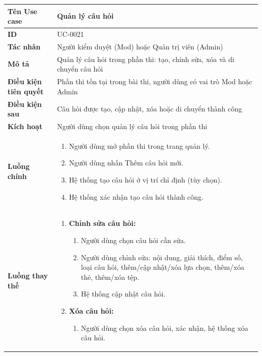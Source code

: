 {
\renewcommand{\arraystretch}{1.5}

\begin{tabularx}{\textwidth}{|>{\raggedright\arraybackslash}X|>{\raggedright\arraybackslash}X|}
\hline
\textbf{Tên Use case} & Quản lý câu hỏi \\
\hline
\textbf{ID} & UC-0021 \\
\hline
\textbf{Tác nhân} & Người kiểm duyệt (Mod) hoặc Quản trị viên (Admin) \\
\hline
\textbf{Mô tả} & Quản lý câu hỏi trong phần thi: tạo, chỉnh sửa, xóa và di chuyển câu hỏi \\
\hline
\textbf{Điều kiện tiên quyết} & Phần thi tồn tại trong bài thi, người dùng có vai trò Mod hoặc Admin \\
\hline
\textbf{Điều kiện sau} & Câu hỏi được tạo, cập nhật, xóa hoặc di chuyển thành công \\
\hline
\textbf{Kích hoạt} & Người dùng chọn quản lý câu hỏi trong phần thi \\
\hline
\textbf{Luồng chính} &
\begin{enumerate}
    \item Người dùng mở phần thi trong trang quản lý.
    \item Người dùng nhấn Thêm câu hỏi mới.
    \item Hệ thống tạo câu hỏi ở vị trí chỉ định (tùy chọn).
    \item Hệ thống xác nhận tạo câu hỏi thành công.
\end{enumerate} \\
\hline
\textbf{Luồng thay thế} &
\begin{enumerate}
    \item \textbf{Chỉnh sửa câu hỏi:}
    \begin{enumerate}
        \item[2A.] Người dùng chọn câu hỏi cần sửa.
        \item[3A.] Người dùng chỉnh sửa: nội dung, giải thích, điểm số, loại câu hỏi, thêm/cập nhật/xóa lựa chọn, thêm/xóa thẻ, thêm/xóa tệp.
        \item[4A.] Hệ thống cập nhật câu hỏi.
    \end{enumerate}
    \item \textbf{Xóa câu hỏi:}
    \begin{enumerate}
        \item[2B.] Người dùng chọn xóa câu hỏi, xác nhận, hệ thống xóa câu hỏi.
    \end{enumerate}

\end{enumerate}
\end{tabularx}}
